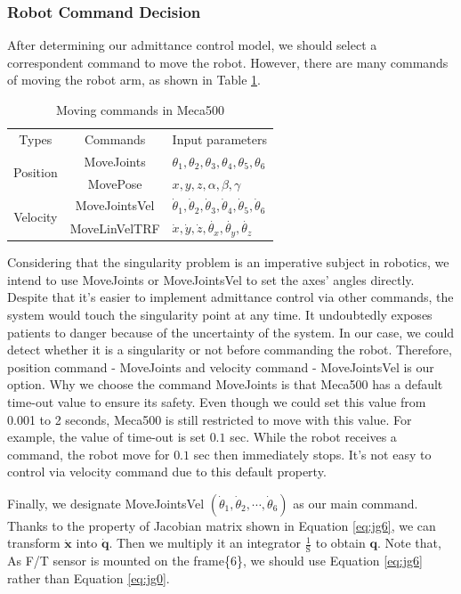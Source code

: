 \subsubsection{Robot Command Decision}
\hspace*{6mm}After determining our admittance control model, we should select a correspondent command to move the robot. However, there are many commands of moving the robot arm, as shown in Table \ref{tab:commands}.
\begin{table}[htbp]
\centering
\caption{Moving commands in Meca500}
\label{tab:commands}
\begin{tabular}{c|c|l} 
\hline \hline
Types										&Commands			&Input parameters\\
\cline{1-3}
\multirow{2}{*}{Position}					&MoveJoints			&\noindent $\theta _1, \theta _2 ,\theta _3 ,\theta _4 ,\theta _5 , \theta _6 $\\\cline{2-3}
											&MovePose			&\noindent$x,y,z,\alpha ,\beta ,\gamma $\\
\cline{1-3}
\multirow{2}{*}{Velocity}					&MoveJointsVel		&$\dot{\theta}_1, \dot{\theta}_2, \dot{\theta}_3,\dot{\theta}_4, \dot{\theta}_5 , \dot{\theta}_6 $\\\cline{2-3}
											&MoveLinVelTRF		&$\dot{x},\dot{y},\dot{z},\dot{\theta _x},\dot{\theta _y},\dot{\theta _z}$\\
\hline \hline
\end{tabular}
\end{table}
\par
Considering that the singularity problem is an imperative subject in robotics, we intend to use MoveJoints or MoveJointsVel to set the axes' angles directly. Despite that it's easier to implement admittance control via other commands, the system would touch the singularity point at any time. It undoubtedly exposes patients to danger because of the uncertainty of the system. In our case, we could detect whether it is a singularity or not before commanding the robot. Therefore, position command - MoveJoints and velocity command - MoveJointsVel is our option. Why we choose the command MoveJoints is that Meca500 has a default time-out value to ensure its safety. Even though we could set this value from 0.001 to 2 seconds, Meca500 is still restricted to move with this value. For example, the value of time-out is set $0.1$ sec. While the robot receives a command, the robot move for $0.1$ sec then immediately stops. It's not easy to control via velocity command due to this default property.
\par
Finally, we designate MoveJointsVel $\left(\dot{\theta}_1, \dot{\theta}_2,\cdots , \dot{\theta}_6 \right)$ as our main command. Thanks to the property of Jacobian matrix shown in Equation \ref{eq:jg6}, we can transform $\boldsymbol{\dot{x}}$ into $\boldsymbol{\dot{q}}$. Then we multiply it an integrator $\frac{1}{\mathrm{S}}$
to obtain $\boldsymbol{q}$. Note that, As F/T sensor is mounted on the frame\{6\}, we should use Equation \ref{eq:jg6} rather than Equation \ref{eq:jg0}. 
